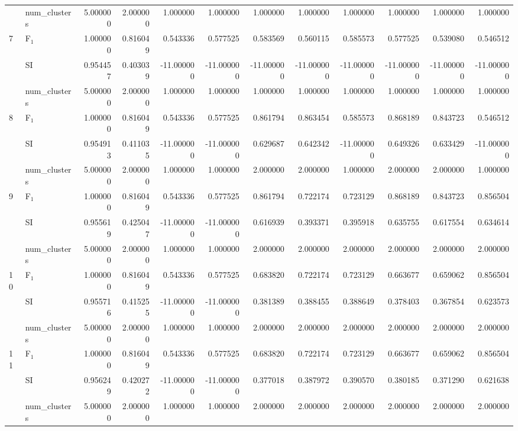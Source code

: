 \begin{tabular}{llrrrrrrrrrr}
 & num_clusters & 5.000000 & 2.000000 & 1.000000 & 1.000000 & 1.000000 & 1.000000 & 1.000000 & 1.000000 & 1.000000 & 1.000000 \\
\multirow[c]{3}{*}{7} & F$_1$ & 1.000000 & 0.816049 & 0.543336 & 0.577525 & 0.583569 & 0.560115 & 0.585573 & 0.577525 & 0.539080 & 0.546512 \\
 & SI & 0.954457 & 0.403039 & -11.000000 & -11.000000 & -11.000000 & -11.000000 & -11.000000 & -11.000000 & -11.000000 & -11.000000 \\
 & num_clusters & 5.000000 & 2.000000 & 1.000000 & 1.000000 & 1.000000 & 1.000000 & 1.000000 & 1.000000 & 1.000000 & 1.000000 \\
\multirow[c]{3}{*}{8} & F$_1$ & 1.000000 & 0.816049 & 0.543336 & 0.577525 & 0.861794 & 0.863454 & 0.585573 & 0.868189 & 0.843723 & 0.546512 \\
 & SI & 0.954913 & 0.411035 & -11.000000 & -11.000000 & 0.629687 & 0.642342 & -11.000000 & 0.649326 & 0.633429 & -11.000000 \\
 & num_clusters & 5.000000 & 2.000000 & 1.000000 & 1.000000 & 2.000000 & 2.000000 & 1.000000 & 2.000000 & 2.000000 & 1.000000 \\
\multirow[c]{3}{*}{9} & F$_1$ & 1.000000 & 0.816049 & 0.543336 & 0.577525 & 0.861794 & 0.722174 & 0.723129 & 0.868189 & 0.843723 & 0.856504 \\
 & SI & 0.955619 & 0.425047 & -11.000000 & -11.000000 & 0.616939 & 0.393371 & 0.395918 & 0.635755 & 0.617554 & 0.634614 \\
 & num_clusters & 5.000000 & 2.000000 & 1.000000 & 1.000000 & 2.000000 & 2.000000 & 2.000000 & 2.000000 & 2.000000 & 2.000000 \\
\multirow[c]{3}{*}{10} & F$_1$ & 1.000000 & 0.816049 & 0.543336 & 0.577525 & 0.683820 & 0.722174 & 0.723129 & 0.663677 & 0.659062 & 0.856504 \\
 & SI & 0.955716 & 0.415255 & -11.000000 & -11.000000 & 0.381389 & 0.388455 & 0.388649 & 0.378403 & 0.367854 & 0.623573 \\
 & num_clusters & 5.000000 & 2.000000 & 1.000000 & 1.000000 & 2.000000 & 2.000000 & 2.000000 & 2.000000 & 2.000000 & 2.000000 \\
\multirow[c]{3}{*}{11} & F$_1$ & 1.000000 & 0.816049 & 0.543336 & 0.577525 & 0.683820 & 0.722174 & 0.723129 & 0.663677 & 0.659062 & 0.856504 \\
 & SI & 0.956249 & 0.420272 & -11.000000 & -11.000000 & 0.377018 & 0.387972 & 0.390570 & 0.380185 & 0.371290 & 0.621638 \\
 & num_clusters & 5.000000 & 2.000000 & 1.000000 & 1.000000 & 2.000000 & 2.000000 & 2.000000 & 2.000000 & 2.000000 & 2.000000 \\
\bottomrule
\end{tabular}
